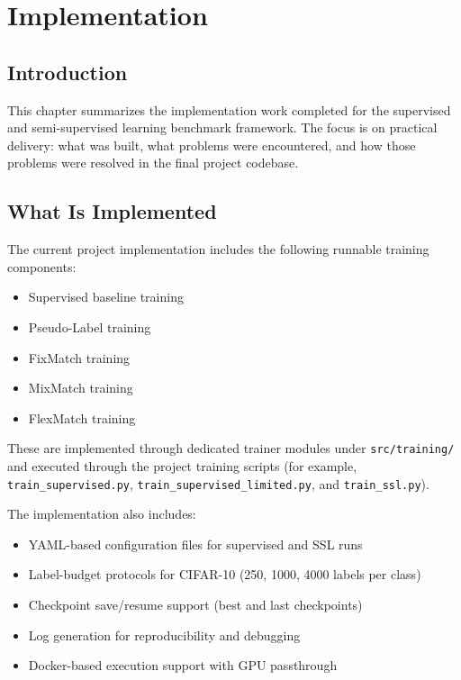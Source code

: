 \chapter{Implementation}
\label{chap:imp}

\section{Introduction}

This chapter summarizes the implementation work completed for the supervised and semi-supervised learning benchmark framework. The focus is on practical delivery: what was built, what problems were encountered, and how those problems were resolved in the final project codebase.

\section{What Is Implemented}

The current project implementation includes the following runnable training components:

\begin{itemize}
    \item Supervised baseline training
    \item Pseudo-Label training
    \item FixMatch training
    \item MixMatch training
    \item FlexMatch training
\end{itemize}

These are implemented through dedicated trainer modules under \texttt{src/training/} and executed through the project training scripts (for example, \texttt{train\_supervised.py}, \texttt{train\_supervised\_limited.py}, and \texttt{train\_ssl.py}).

The implementation also includes:

\begin{itemize}
    \item YAML-based configuration files for supervised and SSL runs
    \item Label-budget protocols for CIFAR-10 (250, 1000, 4000 labels per class)
    \item Checkpoint save/resume support (best and last checkpoints)
    \item Log generation for reproducibility and debugging
    \item Docker-based execution support with GPU passthrough
\end{itemize}

